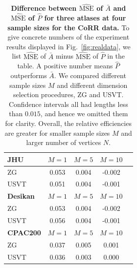 \documentclass[10pt,letterpaper]{article}
\renewcommand{\hat}{\widehat}
\begin{document}
\begin{table}[!tb]
    \centering
\begin{tabular}{lcccc}\toprule
\multicolumn{1}{l}{\textbf{JHU}} & $M=1$  & $M=5$  & $M=10$ \\\midrule
ZG      & 0.053 & 0.004 & -0.002 \\
USVT    & 0.051 & 0.004 & -0.001 \\\midrule
\multicolumn{1}{l}{\textbf{Desikan}} & $M=1$  & $M=5$  & $M=10$ \\ \midrule
ZG      & 0.053 & 0.004 & -0.002 \\
USVT    & 0.056 & 0.004 & -0.001 \\\midrule
\multicolumn{1}{l}{\textbf{CPAC200}} & $M=1$  & $M=5$  & $M=10$  \\\midrule
ZG      & 0.037 & 0.005 & 0.001 \\
USVT    & 0.036 & 0.003 & 0.000 \\\bottomrule
\end{tabular}
    \caption{{\bf Difference between $\hat{\mathrm{MSE}}$ of $\bar{A}$ and $\hat{\mathrm{MSE}}$ of $\hat{P}$ for three atlases at four sample sizes for the CoRR data.}
    To give concrete numbers of the experiment results displayed in Fig.~\ref{fig:realdata}, we list $\hat{\mathrm{MSE}}$ of $\bar{A}$ minus $\hat{\mathrm{MSE}}$ of $\hat{P}$ in the table. A positive number means $\hat{P}$ outperforms $\bar{A}$.
     We compared different sample sizes $M$ and different dimension selection procedures, ZG and USVT.
    Confidence intervals all had lengths less than $0.015$, and hence we omitted them for clarity.
    Overall, the relative efficiencies are greater for smaller sample sizes $M$ and larger number of vertices $N$. 
    } 
    \label{tab:corr_mse}
\end{table}
\end{document}
